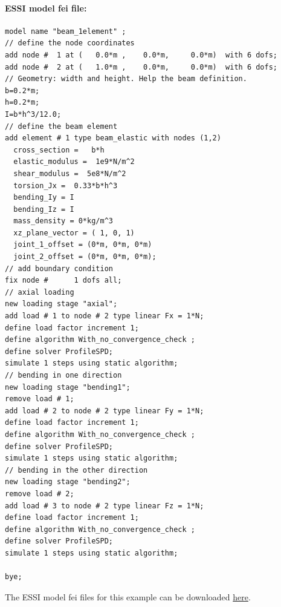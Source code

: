 \documentclass[fleqn,11pt]{article}
\begin{document}
 
 \paragraph{ESSI model fei file: }
 
 \begin{lstlisting}
model name "beam_1element" ;
// define the node coordinates
add node #  1 at (   0.0*m ,    0.0*m,     0.0*m)  with 6 dofs;
add node #  2 at (   1.0*m ,    0.0*m,     0.0*m)  with 6 dofs;
// Geometry: width and height. Help the beam definition.
b=0.2*m;
h=0.2*m;
I=b*h^3/12.0;
// define the beam element
add element # 1 type beam_elastic with nodes (1,2) 
  cross_section =   b*h 
  elastic_modulus =  1e9*N/m^2
  shear_modulus =  5e8*N/m^2
  torsion_Jx =  0.33*b*h^3
  bending_Iy = I
  bending_Iz = I
  mass_density = 0*kg/m^3
  xz_plane_vector = ( 1, 0, 1) 
  joint_1_offset = (0*m, 0*m, 0*m) 
  joint_2_offset = (0*m, 0*m, 0*m);
// add boundary condition
fix node #      1 dofs all;
// axial loading
new loading stage "axial";
add load # 1 to node # 2 type linear Fx = 1*N;
define load factor increment 1;
define algorithm With_no_convergence_check ;
define solver ProfileSPD;
simulate 1 steps using static algorithm;
// bending in one direction
new loading stage "bending1";
remove load # 1;
add load # 2 to node # 2 type linear Fy = 1*N;
define load factor increment 1;
define algorithm With_no_convergence_check ;
define solver ProfileSPD;
simulate 1 steps using static algorithm;
// bending in the other direction
new loading stage "bending2";
remove load # 2;
add load # 3 to node # 2 type linear Fz = 1*N;
define load factor increment 1;
define algorithm With_no_convergence_check ;
define solver ProfileSPD;
simulate 1 steps using static algorithm;
  
bye;
\end{lstlisting}
 
 
The    ESSI   model   fei   files   for   this   example   can   be   downloaded
 \href{https://github.com/BorisJeremic/Real-ESSI-Examples/blob/master/model_fei_file/Simple_beam_static_cantilever/Simple_beam_static_cantilever.tgz?raw=true}{here}.
 
 
 
 
 
 
 
%  
%  
\end{document}

